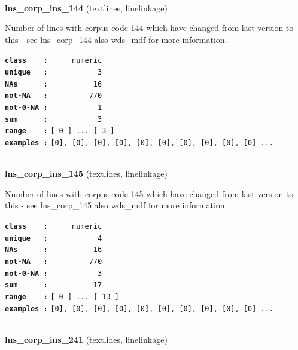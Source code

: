 \documentclass[]{article}
\begin{document}
~

\textbf{lns\_corp\_ins\_144} (textlines, linelinkage)

Number of lines with corpus code 144 which have changed from last
version to this - see lns\_corp\_144 also wds\_mdf for more information.

\textbf{\texttt{class\ \ \ \ :}} \texttt{~~~~~numeric}\\
\textbf{\texttt{unique\ \ \ :}} \texttt{~~~~~~~~~~~3}\\
\textbf{\texttt{NAs\ \ \ \ \ \ :}} \texttt{~~~~~~~~~~16}\\
\textbf{\texttt{not-NA\ \ \ :}} \texttt{~~~~~~~~~770}\\
\textbf{\texttt{not-0-NA\ :}} \texttt{~~~~~~~~~~~1}\\
\textbf{\texttt{sum\ \ \ \ \ \ :}} \texttt{~~~~~~~~~~~3}\\
\textbf{\texttt{range\ \ \ \ :}}
\texttt{{[}\ 0\ {]}\ ...\ {[}\ 3\ {]}}\\
\textbf{\texttt{examples\ :}}
\texttt{{[}0{]},\ {[}0{]},\ {[}0{]},\ {[}0{]},\ {[}0{]},\ {[}0{]},\ {[}0{]},\ {[}0{]},\ {[}0{]},\ {[}0{]}\ ...}\\

~

\textbf{lns\_corp\_ins\_145} (textlines, linelinkage)

Number of lines with corpus code 145 which have changed from last
version to this - see lns\_corp\_145 also wds\_mdf for more information.

\textbf{\texttt{class\ \ \ \ :}} \texttt{~~~~~numeric}\\
\textbf{\texttt{unique\ \ \ :}} \texttt{~~~~~~~~~~~4}\\
\textbf{\texttt{NAs\ \ \ \ \ \ :}} \texttt{~~~~~~~~~~16}\\
\textbf{\texttt{not-NA\ \ \ :}} \texttt{~~~~~~~~~770}\\
\textbf{\texttt{not-0-NA\ :}} \texttt{~~~~~~~~~~~3}\\
\textbf{\texttt{sum\ \ \ \ \ \ :}} \texttt{~~~~~~~~~~17}\\
\textbf{\texttt{range\ \ \ \ :}}
\texttt{{[}\ 0\ {]}\ ...\ {[}\ 13\ {]}}\\
\textbf{\texttt{examples\ :}}
\texttt{{[}0{]},\ {[}0{]},\ {[}0{]},\ {[}0{]},\ {[}0{]},\ {[}0{]},\ {[}0{]},\ {[}0{]},\ {[}0{]},\ {[}0{]}\ ...}\\

~

\textbf{lns\_corp\_ins\_241} (textlines, linelinkage)
\end{document}
